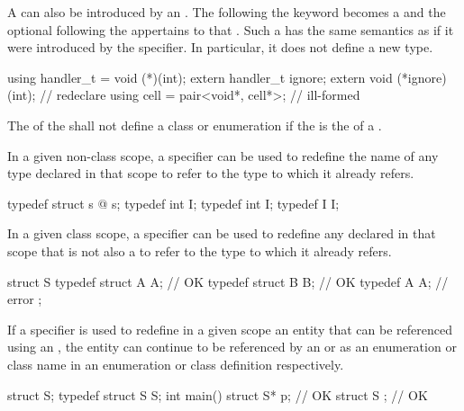 \pnum
A  can also be introduced by an
. The  following the
 keyword becomes a 
and the optional  following the
 appertains to that .
Such a  has the same
semantics as if it were introduced by the  specifier. In
particular, it does not define a new type.
\begin{example}

\begin{codeblock}
using handler_t = void (*)(int);
extern handler_t ignore;
extern void (*ignore)(int);         // redeclare 
using cell = pair<void*, cell*>;    // ill-formed
\end{codeblock}

\end{example}
The 
of the  shall not define
a class or enumeration if the 
is the  of a .

\pnum
{}%
In a given non-class scope, a  specifier can be used to
redefine the name of any type declared in that scope to refer to the
type to which it already refers.
\begin{example}

\begin{codeblock}
typedef struct s { @\commentellip@ } s;
typedef int I;
typedef int I;
typedef I I;
\end{codeblock}
\end{example}

\pnum
In a given class scope, a  specifier can be used to
redefine any  declared in that scope that is not
also a  to refer to the type to which it already
refers.
\begin{example}

\begin{codeblock}
struct S {
  typedef struct A { } A;       // OK
  typedef struct B B;           // OK
  typedef A A;                  // error
};
\end{codeblock}
\end{example}

\pnum
If a  specifier is used to redefine in a given scope an
entity that can be referenced using an ,
the entity can continue to be referenced by an
 or as an enumeration or class name
in an enumeration or class definition respectively. \begin{example}
\begin{codeblock}
struct S;
typedef struct S S;
int main() {
  struct S* p;                  // OK
}
struct S { };                   // OK
\end{codeblock}
\end{example}

